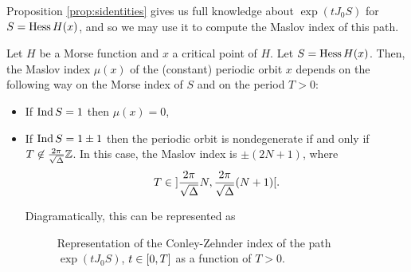 Proposition \ref{prop:sidentities} gives us full knowledge about $\exp(t J_0 S)$ for $S = \operatorname{Hess} H(x)$, and so we may use it to compute the Maslov index of this path.

\begin{prop}\label{maslovmorse}
Let $H$ be a Morse function and $x$ a critical point of $H$. Let $S = \operatorname{Hess} H(x)$. Then, the Maslov index $\mu(x)$ of the (constant) periodic orbit $x$ depends on the following way on the Morse index of $S$ and on the period $T > 0$:
\begin{itemize}
\item If $\operatorname{Ind} S = 1$ then $\mu(x) = 0$,
\item If $\operatorname{Ind} S = 1 \pm 1$ then the periodic orbit is nondegenerate if and only if $T \not \in \frac{2 \pi}{\sqrt\Delta} \mathbb{Z}$. In this case, the Maslov index is $\pm(2N+1)$, where
\begin{equation}
T \in \ointerval{\frac{2\pi}{\sqrt\Delta}N}{\frac{2\pi}{\sqrt\Delta}(N+1)}.
\end{equation}

Diagramatically, this can be represented as
\begin{figure}[H]
\centering
{}
\caption{Representation of the Conley-Zehnder index of the path $\exp(t J_0 S)$, $t \in \interval 0 T$ as a function of $T > 0$.}
\end{figure}
\end{itemize}
\end{prop}

